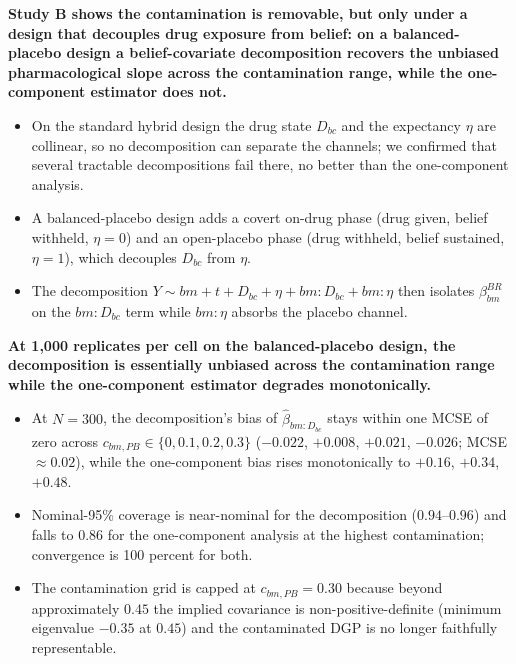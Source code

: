 \documentclass[
  11pt,
]{article}
\begin{document}
\textbf{Study B shows the contamination is removable, but only under a design that decouples drug exposure from belief: on a balanced-placebo design a belief-covariate decomposition recovers the unbiased pharmacological slope across the contamination range, while the one-component estimator does not.}

\begin{itemize}\setlength{\itemsep}{2pt}\setlength{\parskip}{0pt}
\item On the standard hybrid design the drug state $D_{bc}$ and the expectancy $\eta$ are collinear, so no decomposition can separate the channels; we confirmed that several tractable decompositions fail there, no better than the one-component analysis.
\item A balanced-placebo design adds a covert on-drug phase (drug given, belief withheld, $\eta=0$) and an open-placebo phase (drug withheld, belief sustained, $\eta=1$), which decouples $D_{bc}$ from $\eta$.
\item The decomposition $Y \sim bm + t + D_{bc} + \eta + bm{:}D_{bc} + bm{:}\eta$ then isolates $\beta_{bm}^{BR}$ on the $bm{:}D_{bc}$ term while $bm{:}\eta$ absorbs the placebo channel.
\end{itemize}

\textbf{At 1{,}000 replicates per cell on the balanced-placebo design, the decomposition is essentially unbiased across the contamination range while the one-component estimator degrades monotonically.}

\begin{itemize}\setlength{\itemsep}{2pt}\setlength{\parskip}{0pt}
\item At $N=300$, the decomposition's bias of $\hat\beta_{bm:D_{bc}}$ stays within one MCSE of zero across $c_{bm,PB} \in \{0, 0.1, 0.2, 0.3\}$ ($-0.022$, $+0.008$, $+0.021$, $-0.026$; MCSE $\approx 0.02$), while the one-component bias rises monotonically to $+0.16$, $+0.34$, $+0.48$.
\item Nominal-95\% coverage is near-nominal for the decomposition ($0.94$--$0.96$) and falls to $0.86$ for the one-component analysis at the highest contamination; convergence is 100 percent for both.
\item The contamination grid is capped at $c_{bm,PB}=0.30$ because beyond approximately $0.45$ the implied covariance is non-positive-definite (minimum eigenvalue $-0.35$ at $0.45$) and the contaminated DGP is no longer faithfully representable.
\end{itemize}
\end{document}
